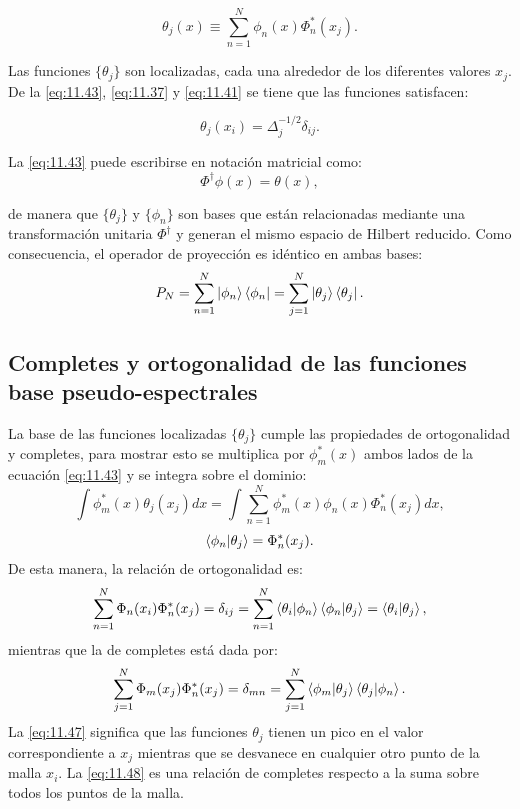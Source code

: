 \begin{equation}
  \label{eq:11.43}
  \theta_j(x) \equiv \sum_{n=1}^N\phi_n(x)\Phi_n^*(x_j).
\end{equation}

Las funciones $\{\theta_j\}$ son localizadas, cada una alrededor de los diferentes valores $x_j$. De la \autoref{eq:11.43}, \autoref{eq:11.37} y \autoref{eq:11.41} se tiene que las funciones satisfacen:

\begin{equation}
  \label{eq:11.44}
  \theta_j(x_i) = \Delta_j^{-1/2}\delta_{ij}.
\end{equation}

La \autoref{eq:11.43} puede escribirse en notación matricial como:
\begin{equation}
  \label{eq:11.45}
  \Phi^{\dag}\phi(x) = \theta(x),
\end{equation}

\noindent de manera que $\{\theta_j\}$ y $\{\phi_n \}$ son bases que están relacionadas mediante una transformación unitaria $\Phi^{\dag}$ y generan el mismo espacio de Hilbert reducido. Como consecuencia, el operador de proyección es idéntico en ambas bases:
\begin{equation}
  \label{eq:proyecbases}
  P_N = \sum_{n=1}^N\ket{\phi_n}\bra{\phi_n}=\sum_{j=1}^N\ket{\theta_j}\bra{\theta_j}.
\end{equation}

\subsection{Completes y ortogonalidad de las funciones base pseudo-espectrales}
La base de las funciones localizadas $\{\theta_j\}$ cumple las propiedades de ortogonalidad y completes, para mostrar esto se multiplica por $\phi^*_m(x)$ ambos lados de la ecuación \autoref{eq:11.43} y se integra sobre el dominio:
$$ \int \phi^*_m(x) \theta_j(x_j) dx = \int \sum_{n=1}^{N}\phi^*_m(x)\phi_n(x)\Phi^*_n(x_j) dx,$$
\begin{equation}
  \label{eq:11.46}
\bra{\phi_n} \ket{\theta_j} =   \Phi^*_n(x_j). 
\end{equation}
De esta manera, la relación de ortogonalidad es:
\begin{equation}
  \label{eq:11.47}
  \sum_{n=1}^N \Phi_n(x_i)\Phi_n^*(x_j) = \delta_{ij}=\sum_{n=1}^{N}\bra{\theta_i}\ket{\phi_n}\bra{\phi_n}\ket{\theta_j} = \bra{\theta_i}\ket{\theta_j},
\end{equation}
mientras que la de completes está dada por:
\begin{equation}
  \label{eq:11.48}
  \sum_{j=1}^N \Phi_m(x_j)\Phi_n^*(x_j) = \delta_{mn} = \sum_{j=1}^N \bra{\phi_m} \ket{\theta_j} \bra{\theta_j}\ket{\phi_n}.
\end{equation}
La \autoref{eq:11.47} significa que las funciones $\theta_j$ tienen un pico en el valor correspondiente a $x_j$ mientras que se desvanece en cualquier otro punto de la malla $x_i$. La \autoref{eq:11.48} es una relación de completes respecto a la suma sobre todos los puntos de la malla.

